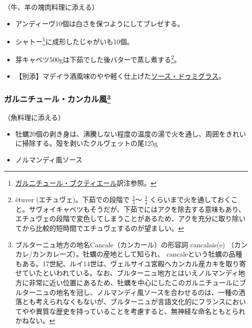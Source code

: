 \begin{recette}
（牛、羊の塊肉料理に添える）

\begin{itemize}
\item
  アンディーヴ10個は白さを保つようにしてブレゼする。
\item
  シャトー\footnote{\protect\hyperlink{garniture-bouquetiere}{ガルニチュール・ブクティエール}訳注参照。}に成形したじゃがいも10個。
\item
  芽キャベツ500gは下茹でした後バターで蒸し煮する\footnote{étuver
    (エチュヴェ)。下茹での段階で \(\frac{2}{3}\)〜 \(\frac{3}{4}\)
    くらいまで火を通しておくこと。サヴォイキャベツもそうだが、下茹でにはアクを除去する意味もあり、エチュヴェの段階で変色してしまうことがあるため、アクを充分に取り除いてから比較的短時間でエチュヴェするのが望ましい。}。
\item
  【別添】マデイラ酒風味のやや軽く仕上げた\protect\hyperlink{sauce-demi-glace}{ソース・ドゥミグラス}。
\end{itemize}

\atoaki{}

\hypertarget{garniture-cancalaise}{%
\subsubsection[ガルニチュール・カンカル風]{\texorpdfstring{ガルニチュール・カンカル風\footnote{ブルターニュ地方の地名Cancale（カンカール）の形容詞
  cancalais(e) （カンカレ/カンカレーズ）。牡蠣の産地として知られ、
  cancaleという牡蠣の品種もある。17世紀、ルイ14世は、ヴェルサイユ宮殿へカンカル産カキを取り寄せていたといわれている。なお、ブルターニュ地方とはいえノルマンディ地方に非常に近い位置にあるため、牡蠣を中心にしたこのガルニチュールにブルターニュの地名を冠し、ノルマンディ風ソースを合わせるのは、一種の洒落とも考えられなくもないが、ブルターニュが言語文化的にフランスにおいてやや異質な歴史を持っていることを考慮すると、無神経な命名ともとられかねない。}}{ガルニチュール・カンカル風}}\label{garniture-cancalaise}}



（魚料理に添える）

\begin{itemize}
\item
  牡蠣20個の剥き身は、沸騰しない程度の温度の湯で火を通し、周囲をきれいに掃除する。殻を剥いたクルヴェットの尾125g
\item
  ノルマンディ風ソース
\end{itemize}


\end{recette}
